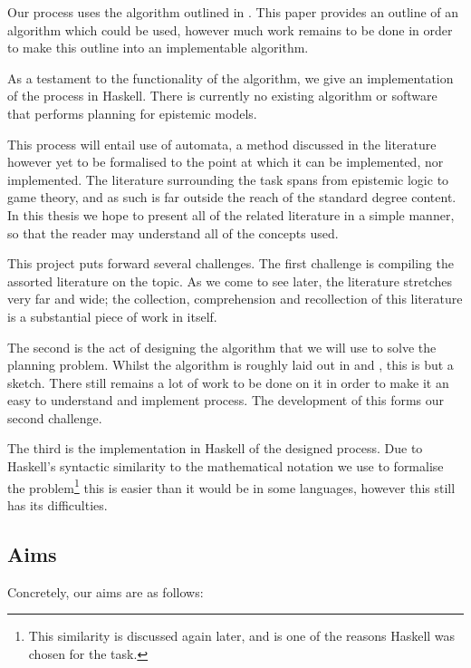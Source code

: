 \documentclass[12pt, a4paper]{article}
\begin{document}
Our process uses the algorithm outlined in \cite{AutomataTechniques}. This paper
provides an outline of an algorithm which could be used, however much work
remains to be done in order to make this outline into an implementable
algorithm. 

As a testament to the functionality of the algorithm, we give an implementation
of the process in Haskell. There is currently no existing algorithm or software
that performs planning for epistemic models. 

This process will entail use of automata, a method discussed in the literature
however yet to be formalised to the point at which it can be implemented, nor
implemented. The literature surrounding the task spans from epistemic logic to
game theory, and as such is far outside the reach of the standard degree
content. In this thesis we hope to present all of the related literature in a
simple manner, so that the reader may understand all of the concepts used. 

\bigskip

This project puts forward several challenges. The first challenge is compiling
the assorted literature on the topic. As we come to see later, the literature
stretches very far and wide; the collection, comprehension and recollection of
this literature is a substantial piece of work in itself.

\bigskip

The second is the act of designing the algorithm that we will use to solve the
planning problem. Whilst the algorithm is roughly laid out in
\cite{AutomataTechniques} and \cite{UniformStrategies}, this is but a sketch.
There still remains a lot of work to be done on it in order to make it an easy
to understand and implement process. The development of this forms our second
challenge.

\bigskip

The third is the implementation in Haskell of the designed process. Due to
Haskell's syntactic similarity to the mathematical notation we use to formalise
the problem\footnote{This similarity is discussed again later, and is one of the
  reasons Haskell was chosen for the task.} this is easier than it would be in
some languages, however this still has its difficulties.

\subsection{Aims}

Concretely, our aims are as follows:
\end{document}
